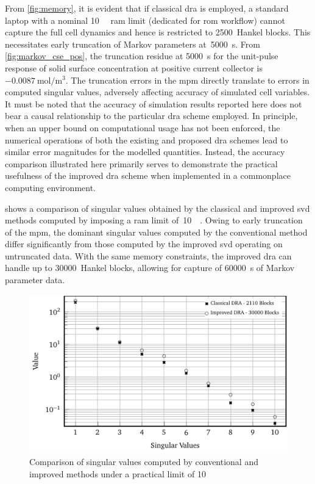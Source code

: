 From  \cref{fig:memory},   it  is  evident   that  if  classical   \gls{dra}  is
employed,  a  standard  laptop  with  a  nominal  \SI{10}{\giga\byte}  \gls{ram}
limit   (dedicated   for   \gls{rom}   workflow)   cannot   capture   the   full
cell   dynamics  and   hence   is  restricted   to   2500~Hankel  blocks.   This
necessitates early  truncation of Markov parameters  at~\SI{5000}{\second}. From
\cref{fig:markov_cse_pos}, the truncation residue  at \SI{5000}{\second} for the
unit-pulse response of solid surface concentration at positive current collector
is~$\SI{-0.0087}{\mole\per\meter\cubed}$. The truncation errors in the \gls{mpm}
directly translate  to errors in  computed singular values,  adversely affecting
accuracy of  simulated cell  variables. It  must be noted  that the  accuracy of
simulation results  reported here  does not  bear a  causal relationship  to the
particular  \gls{dra} scheme  employed. In  principle,  when an  upper bound  on
computational usage has not been enforced,  the numerical operations of both the
existing and proposed \gls{dra} schemes lead to similar error magnitudes for the
modelled quantities. Instead, the accuracy comparison illustrated here primarily
serves to demonstrate the practical  usefulness of the improved \gls{dra} scheme
when implemented in a commonplace computing environment.

  shows a  comparison  of singular  values  obtained by  the
classical and improved \gls{svd} methods  computed by imposing a \gls{ram} limit
of~\SI{10}{\giga\byte}. Owing to early truncation of the \gls{mpm}, the dominant
singular values  computed by the  conventional method differ  significantly from
those computed by the improved \gls{svd} operating on untruncated data. With the
same memory  constraints, the improved  \gls{dra} can handle up  to 30000~Hankel
blocks, allowing for capture of \SI{60000}{\second} of Markov parameter data.

\begin{figure}[!htbp]
    \centering
    \includegraphics{chapters/dra/figures/truncated.pdf}
    \caption{Comparison of singular values computed by conventional and improved
         methods under a practical  limit of
    \SI{10}{\giga\byte}}
    \label{fig:truncated}
\end{figure}

